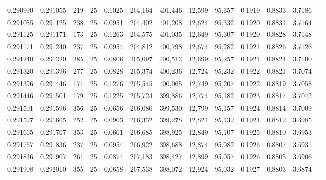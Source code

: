 \begin{tabular}{rrrrrrrrrrrrr}
0.290990 & 0.291055 &   219 &  25 &                                     0.1025 & 204,164 & 401,446 &  12,599 &  95,357 & 0.1919 & 0.8833 & 3.7186 \\
0.291055 & 0.291125 &   238 &  25 &                                     0.0951 & 204,402 & 401,208 &  12,624 &  95,332 & 0.1920 & 0.8831 & 3.7164 \\
0.291125 & 0.291171 &   173 &  25 &                                     0.1263 & 204,575 & 401,035 &  12,649 &  95,307 & 0.1920 & 0.8828 & 3.7148 \\
0.291171 & 0.291240 &   237 &  25 &                                     0.0954 & 204,812 & 400,798 &  12,674 &  95,282 & 0.1921 & 0.8826 & 3.7126 \\
0.291240 & 0.291320 &   285 &  25 &                                     0.0806 & 205,097 & 400,513 &  12,699 &  95,257 & 0.1921 & 0.8824 & 3.7100 \\
0.291320 & 0.291396 &   277 &  25 &                                     0.0828 & 205,374 & 400,236 &  12,724 &  95,232 & 0.1922 & 0.8821 & 3.7074 \\
0.291396 & 0.291446 &   171 &  25 &                                     0.1276 & 205,545 & 400,065 &  12,749 &  95,207 & 0.1922 & 0.8819 & 3.7058 \\
0.291446 & 0.291501 &   179 &  25 &                                     0.1225 & 205,724 & 399,886 &  12,774 &  95,182 & 0.1923 & 0.8817 & 3.7042 \\
0.291501 & 0.291596 &   356 &  25 &                                     0.0656 & 206,080 & 399,530 &  12,799 &  95,157 & 0.1924 & 0.8814 & 3.7009 \\
0.291597 & 0.291665 &   252 &  25 &                                     0.0903 & 206,332 & 399,278 &  12,824 &  95,132 & 0.1924 & 0.8812 & 3.6985 \\
0.291665 & 0.291767 &   353 &  25 &                                     0.0661 & 206,685 & 398,925 &  12,849 &  95,107 & 0.1925 & 0.8810 & 3.6953 \\
0.291767 & 0.291836 &   237 &  25 &                                     0.0954 & 206,922 & 398,688 &  12,874 &  95,082 & 0.1926 & 0.8807 & 3.6931 \\
0.291836 & 0.291907 &   261 &  25 &                                     0.0874 & 207,183 & 398,427 &  12,899 &  95,057 & 0.1926 & 0.8805 & 3.6906 \\
0.291908 & 0.292010 &   355 &  25 &                                     0.0658 & 207,538 & 398,072 &  12,924 &  95,032 & 0.1927 & 0.8803 & 3.6874 \\

\end{tabular}
